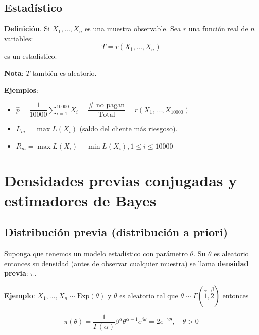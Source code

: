\documentclass[
  12pt,
]{book}
\begin{document}
\hypertarget{estaduxedstico}{%
\section{Estadístico}\label{estaduxedstico}}

\textbf{Definición}. Si \(X_1,\dots,X_n\) es una muestra observable. Sea \(r\) una función real de \(n\) variables:
\begin{equation*}
T = r(X_1,\dots,X_n)
\end{equation*}
es un estadístico.

\textbf{Nota}: \(T\) también es aleatorio.

\textbf{Ejemplos}:

\begin{itemize}
\item
  \(\hat p = \dfrac{1}{10000}\displaystyle\sum_{i=1}^{10000}X_i = \dfrac{\#\text{ no pagan}}{\text{Total}} = r(X_1,\dots,X_{10000})\)
\item
  \(L_m = \max L(X_i)\) (saldo del cliente más riesgoso).
\item
  \(R_m = \max L(X_i) - \min L(X_i), 1\leq i\leq 10000\)
\end{itemize}

\hypertarget{densidades-previas-conjugadas-y-estimadores-de-bayes}{%
\chapter{Densidades previas conjugadas y estimadores de Bayes}\label{densidades-previas-conjugadas-y-estimadores-de-bayes}}

\hypertarget{distribuciuxf3n-previa-distribuciuxf3n-a-priori}{%
\section{Distribución previa (distribución a priori)}\label{distribuciuxf3n-previa-distribuciuxf3n-a-priori}}

Suponga que tenemos un modelo estadístico con parámetro \(\theta\). Su \(\theta\) es aleatorio entonces su densidad (antes de observar cualquier muestra) se llama \textbf{densidad previa}: \(\pi\).

\textbf{Ejemplo}: \(X_1,\dots, X_n \sim \text{Exp}(\theta)\) y \(\theta\) es aleatorio tal que \(\theta \sim \Gamma(\stackrel{\alpha}{1},\stackrel{\beta}{2})\) entonces

\[ \pi(\theta) = \dfrac{1}{\Gamma(\alpha)}\beta^\alpha\theta^{\alpha-1}e^{\beta\theta} = 2e^{-2\theta}, \quad \theta > 0\]
\end{document}
